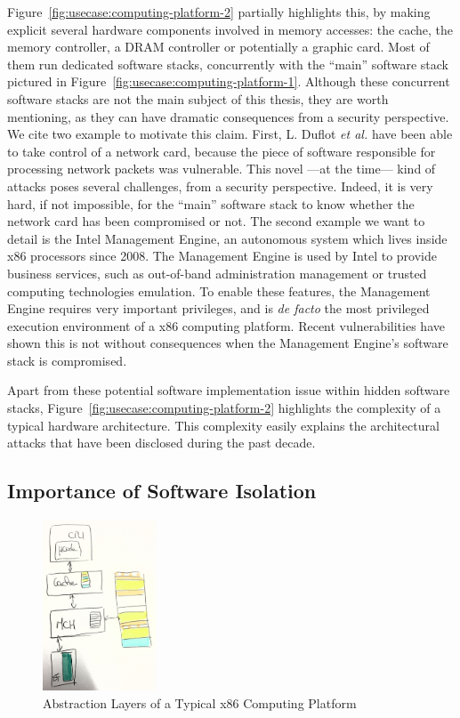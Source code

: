 Figure~\ref{fig:usecase:computing-platform-2} partially highlights this, by
making explicit several hardware components involved in memory accesses: the
cache, the memory controller, a DRAM controller or potentially a graphic card.
%
Most of them run dedicated software stacks, concurrently with the ``main''
software stack pictured in Figure~\ref{fig:usecase:computing-platform-1}.
%
Although these concurrent software stacks are not the main subject of this
thesis, they are worth mentioning, as they can have dramatic consequences from a
security perspective.
%
We cite two example to motivate this claim.
%
First, L. Duflot \emph{et al.} have been able to take control of a network card,
because the piece of software responsible for processing network packets was
vulnerable.
%
This novel ---at the time--- kind of attacks poses several challenges, from a
security perspective.
%
Indeed, it is very hard, if not impossible, for the ``main'' software stack to
know whether the network card has been compromised or not.
%
The second example we want to detail is the Intel Management Engine, an
autonomous system which lives inside x86 processors since 2008.
%
The Management Engine is used by Intel to provide business services, such as
out-of-band administration management or trusted computing technologies
emulation.
%
To enable these features, the Management Engine requires very important
privileges, and is \emph{de facto} the most privileged execution environment of
a x86 computing platform.
%
Recent vulnerabilities have shown this is not without consequences when the
Management Engine's software stack is compromised.

Apart from these potential software implementation issue within hidden software
stacks, Figure~\ref{fig:usecase:computing-platform-2} highlights the complexity
of a typical hardware architecture.
%
This complexity easily explains the architectural attacks that have been
disclosed during the past decade.

\subsection{Importance of Software Isolation}

\begin{figure}
  \centering
  \includegraphics[width=0.3\textwidth]{Figures/computing-platform-3.jpg}
  \caption{Abstraction Layers of a Typical x86 Computing Platform}
  \label{fig:usecase:computing-platform-3}
\end{figure}

